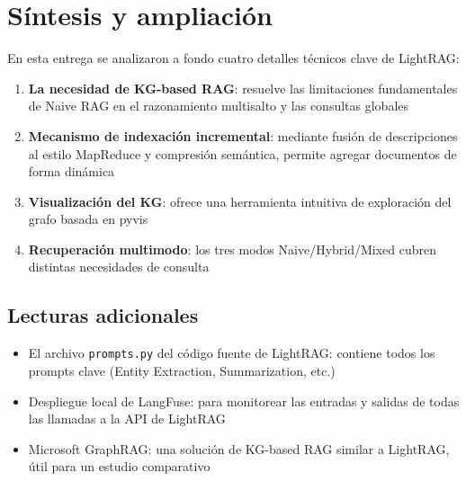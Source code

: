 \section{Síntesis y ampliación}

En esta entrega se analizaron a fondo cuatro detalles técnicos clave de LightRAG:

\begin{enumerate}
    \item \textbf{La necesidad de KG-based RAG}: resuelve las limitaciones fundamentales de Naive RAG en el razonamiento multisalto y las consultas globales
    \item \textbf{Mecanismo de indexación incremental}: mediante fusión de descripciones al estilo MapReduce y compresión semántica, permite agregar documentos de forma dinámica
    \item \textbf{Visualización del KG}: ofrece una herramienta intuitiva de exploración del grafo basada en pyvis
    \item \textbf{Recuperación multimodo}: los tres modos Naive/Hybrid/Mixed cubren distintas necesidades de consulta
\end{enumerate}

\subsection{Lecturas adicionales}

\begin{itemize}
    \item El archivo \texttt{prompts.py} del código fuente de LightRAG: contiene todos los prompts clave (Entity Extraction, Summarization, etc.)
    \item Despliegue local de LangFuse: para monitorear las entradas y salidas de todas las llamadas a la API de LightRAG
    \item Microsoft GraphRAG: una solución de KG-based RAG similar a LightRAG, útil para un estudio comparativo
\end{itemize}




